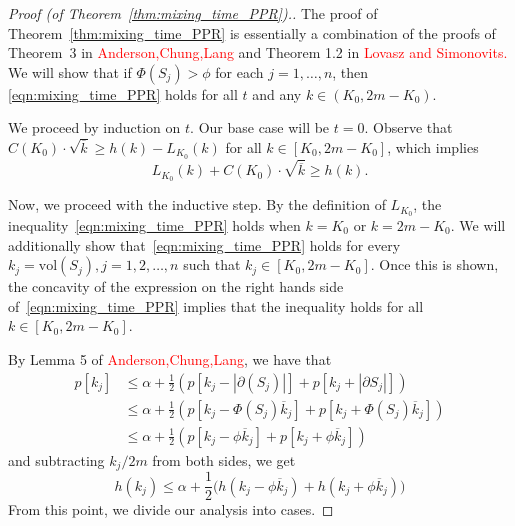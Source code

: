 \documentclass[11pt,twoside]{article}
\newcommand{\vol}{\mathrm{vol}}
\newcommand{\abs}[1]{\left \lvert #1 \right \rvert}
\newcommand{\1}{\mathbf{1}}
\begin{document}
\begin{proof}[Proof (of Theorem~\ref{thm:mixing_time_PPR}).]
The proof of Theorem~\ref{thm:mixing_time_PPR} is essentially a combination of the proofs of Theorem~3 in \textcolor{red}{Anderson,Chung,Lang} and Theorem 1.2 in \textcolor{red}{Lovasz and Simonovits.} We will show that if $\Phi(S_j) > \phi$ for each $j = 1,\ldots,n$, then \eqref{eqn:mixing_time_PPR} holds for all $t$ and any $k \in (K_0,2m - K_0)$.

We proceed by induction on $t$. Our base case will be $t = 0$. Observe that $C(K_0) \cdot \sqrt{\overline{k}} \geq  h(k) - L_{K_0}(k)$ for all $k \in [K_0,2m - K_0]$, which implies
\begin{equation*}
L_{K_0}(k) + C(K_0) \cdot \sqrt{\overline{k}} \geq h(k).
\end{equation*}

Now, we proceed with the inductive step. By the definition of $L_{K_0}$, the inequality~\eqref{eqn:mixing_time_PPR} holds when $k = K_0$ or $k = 2m - K_0$. We will additionally show that~\eqref{eqn:mixing_time_PPR} holds for every $k_j = \vol(S_j), j = 1,2,\ldots,n$ such that $k_j \in [K_0, 2m - K_0]$. Once this is shown, the concavity of the expression on the right hands side of~\eqref{eqn:mixing_time_PPR} implies that the inequality holds for all $k \in [K_0,2m - K_0]$.

By Lemma 5 of \textcolor{red}{Anderson,Chung,Lang}, we have that
\begin{align}
p[k_j] & \leq \alpha + \frac{1}{2}  \left(p[k_j - \abs{\partial(S_j)}] + p[k_j + \abs{\partial{S_j}}]  \right) \nonumber\\
& \leq \alpha + \frac{1}{2} \left(p[k_j - \Phi(S_j) \overline{k}_j] + p[k_j + \Phi(S_j) \overline{k}_j]  \right) \nonumber \\
& \leq \alpha + \frac{1}{2} \left(p[k_j - \phi \overline{k}_j] + p[k_j + \phi \overline{k}_j]\right) \nonumber
\end{align}
and subtracting $k_j/2m$ from both sides, we get
\begin{equation}
\label{eqn:mixing_time_PPR_pf1}
h(k_j) \leq \alpha + \frac{1}{2} \bigl(h(k_j - \phi \overline{k}_j) + h(k_j +  \phi \overline{k}_j) \bigr)
\end{equation}
From this point, we divide our analysis into cases. 


\end{proof}
\end{document}

